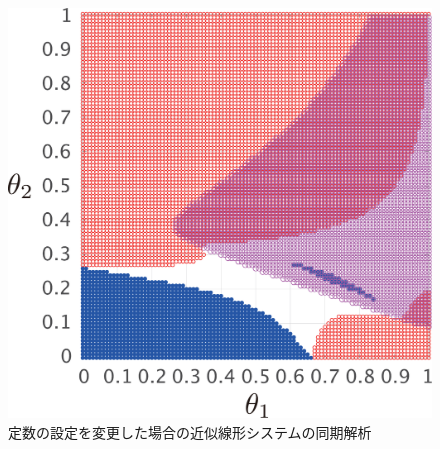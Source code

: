 \documentclass[a4j,10pt,oneside,openany,dvipdfmx]{jsbook}
\begin{document}
\begin{figure}[t]
{\begin{minipage}{0.32\linewidth}
    \centering
    \includegraphics[width = .85\linewidth]{figs/gam5ex}
  \end{minipage}
  \caption{定数の設定を変更した場合の近似線形システムの同期解析}
  \label{fig:gamex}
  }
\end{figure}
\end{document}
